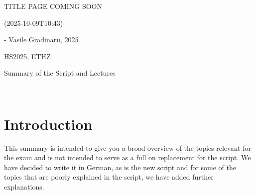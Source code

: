 \documentclass{article}
\begin{document}
\startDocument
\usetcolorboxes
{}

\vspace{2cm}
\begin{Huge}
    \begin{center}
        TITLE PAGE COMING SOON
    \end{center}
\end{Huge}


\vspace{4cm}
\begin{center}
    \begin{Large}
         (2025-10-09T10:43) %
    \end{Large}

    \hspace{3cm} - Vasile Gradinaru, 2025
\end{center}

\vspace{3cm}
\begin{center}
    HS2025, ETHZ\\[0.2cm]
    \begin{Large}
        Summary of the Script and Lectures
    \end{Large}\\[0.2cm]
\end{center}



\newpage
{}



\newpage
\setcounter{section}{-1}
\section{Introduction}
This summary is intended to give you a broad overview of the topics relevant for the exam and is not intended to serve as a full on replacement for the script.
We have decided to write it in German, as is the new script and for some of the topics that are poorly explained in the script, we have added further explanations.
\end{document}

